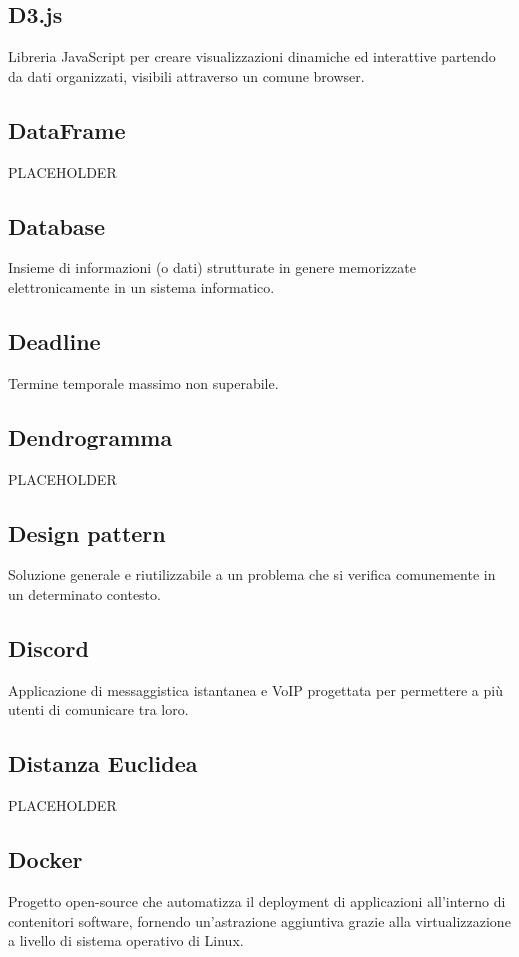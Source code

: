 \documentclass[../glossario.tex]{subfiles}
\begin{document}
    
\subsection*{D3.js}
Libreria JavaScript per creare visualizzazioni dinamiche ed interattive partendo da dati organizzati, visibili attraverso un comune browser.


\subsection*{DataFrame}
PLACEHOLDER


\subsection*{Database}
Insieme di informazioni (o dati) strutturate in genere memorizzate elettronicamente in un sistema informatico.

\subsection*{Deadline}
Termine temporale massimo non superabile.

\subsection*{Dendrogramma}
PLACEHOLDER

\subsection*{Design pattern}
Soluzione generale e riutilizzabile a un problema che si verifica comunemente in un determinato contesto.

\subsection*{Discord}
Applicazione di messaggistica istantanea e VoIP progettata per permettere a più utenti di comunicare tra loro.

\subsection*{Distanza Euclidea}
PLACEHOLDER

\subsection*{Docker}
Progetto open-source che automatizza il deployment di applicazioni all'interno di contenitori software, fornendo un'astrazione aggiuntiva grazie alla virtualizzazione a livello di sistema operativo di Linux.
\end{document}
